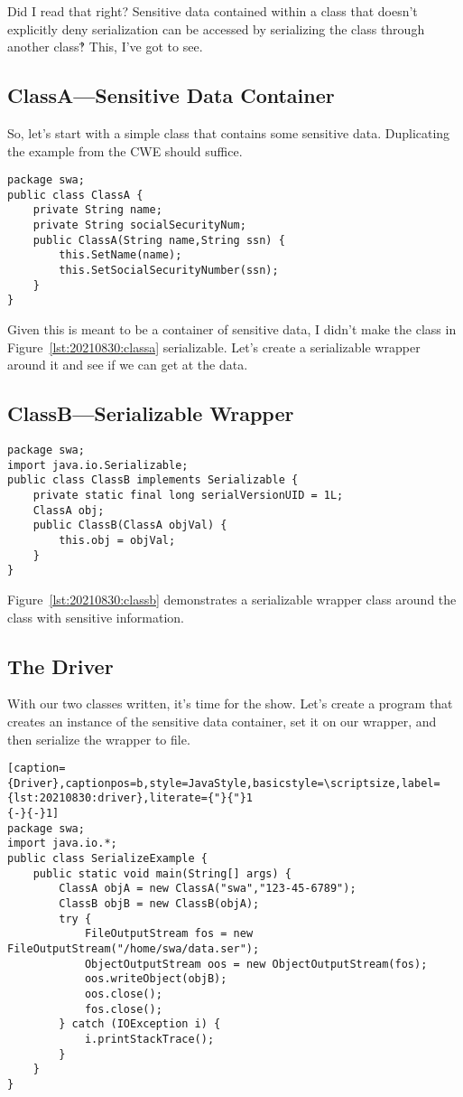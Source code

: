 Did I read that right? Sensitive data contained within a class that doesn't explicitly deny serialization can be accessed by serializing the class through another class‽ This, I've got to see.

\subsection{ClassA---Sensitive Data Container}
So, let's start with a simple class that contains some sensitive data. Duplicating the example from the CWE should suffice.
\begin{lstlisting}[caption={ClassA},captionpos=b,style=JavaStyle,label={lst:20210830:classa}]
package swa;
public class ClassA {
	private String name;
	private String socialSecurityNum;
	public ClassA(String name,String ssn) {
		this.SetName(name);
		this.SetSocialSecurityNumber(ssn);
	}
}
\end{lstlisting}

Given this is meant to be a container of sensitive data, I didn't make the class in Figure~\ref{lst:20210830:classa} serializable. Let's create a serializable wrapper around it and see if we can get at the data.

\subsection{ClassB---Serializable Wrapper}

\begin{lstlisting}[caption={ClassB},captionpos=b,style=JavaStyle,label={lst:20210830:classb}]
package swa;
import java.io.Serializable;
public class ClassB implements Serializable {
	private static final long serialVersionUID = 1L;
	ClassA obj;
	public ClassB(ClassA objVal) {
		this.obj = objVal;
	}
}
\end{lstlisting}

Figure~\ref{lst:20210830:classb} demonstrates a serializable wrapper class around the class with sensitive information.

\subsection{The Driver}
With our two classes written, it's time for the show. Let's create a program that creates an instance of the sensitive data container, set it on our wrapper, and then serialize the wrapper to file.

\begin{lstlisting}[caption={Driver},captionpos=b,style=JavaStyle,basicstyle=\scriptsize,label={lst:20210830:driver},literate={"}{"}1
{-}{-}1]
package swa;
import java.io.*;
public class SerializeExample {
	public static void main(String[] args) {
		ClassA objA = new ClassA("swa","123-45-6789");
		ClassB objB = new ClassB(objA);
		try {
			FileOutputStream fos = new FileOutputStream("/home/swa/data.ser");
			ObjectOutputStream oos = new ObjectOutputStream(fos);
			oos.writeObject(objB);
			oos.close();
			fos.close();
		} catch (IOException i) {
			i.printStackTrace();
		}
	}
}
\end{lstlisting}

